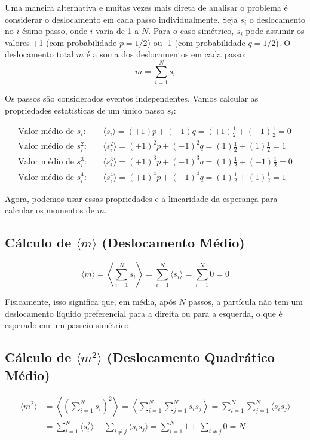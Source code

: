 \documentclass[12pt]{article}
\begin{document}
Uma maneira alternativa e muitas vezes mais direta de analisar o problema é considerar o deslocamento em cada passo individualmente. Seja $s_i$ o deslocamento no $i$-ésimo passo, onde $i$ varia de 1 a $N$. Para o caso simétrico, $s_i$ pode assumir os valores +1 (com probabilidade $p=1/2$) ou -1 (com probabilidade $q=1/2$). O deslocamento total $m$ é a soma dos deslocamentos em cada passo:
\[
m = \sum_{i=1}^{N} s_i
\]

Os passos são considerados eventos independentes. Vamos calcular as propriedades estatísticas de um único passo $s_i$:

\begin{align*}
\text{Valor médio de } s_i: &\quad \langle s_i \rangle = (+1)p + (-1)q = (+1)\frac{1}{2} + (-1)\frac{1}{2} = 0 \\
\text{Valor médio de } s_i^2: &\quad \langle s_i^2 \rangle = (+1)^2 p + (-1)^2 q = (1)\frac{1}{2} + (1)\frac{1}{2} = 1 \\
\text{Valor médio de } s_i^3: &\quad \langle s_i^3 \rangle = (+1)^3 p + (-1)^3 q = (1)\frac{1}{2} + (-1)\frac{1}{2} = 0 \\
\text{Valor médio de } s_i^4: &\quad \langle s_i^4 \rangle = (+1)^4 p + (-1)^4 q = (1)\frac{1}{2} + (1)\frac{1}{2} = 1
\end{align*}

Agora, podemos usar essas propriedades e a linearidade da esperança para calcular os momentos de $m$.

\subsection*{Cálculo de $\langle m \rangle$ (Deslocamento Médio)}

\[
\langle m \rangle = \left\langle \sum_{i=1}^{N} s_i \right\rangle = \sum_{i=1}^{N} \langle s_i \rangle = \sum_{i=1}^{N} 0 = 0
\]

Fisicamente, isso significa que, em média, após $N$ passos, a partícula não tem um deslocamento líquido preferencial para a direita ou para a esquerda, o que é esperado em um passeio simétrico.

\subsection*{Cálculo de $\langle m^2 \rangle$ (Deslocamento Quadrático Médio)}

\begin{align*}
\langle m^2 \rangle &= \left\langle \left( \sum_{i=1}^{N} s_i \right)^2 \right\rangle = \left\langle \sum_{i=1}^{N} \sum_{j=1}^{N} s_i s_j \right\rangle = \sum_{i=1}^{N} \sum_{j=1}^{N} \langle s_i s_j \rangle \\
&= \sum_{i=1}^{N} \langle s_i^2 \rangle + \sum_{i \neq j} \langle s_i s_j \rangle = \sum_{i=1}^{N} 1 + \sum_{i \neq j} 0 = N
\end{align*}
\end{document}
